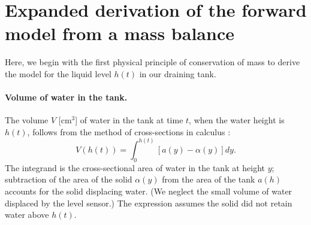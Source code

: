 \documentclass[a4paper,fleqn]{cas-sc}
\begin{document}
\clearpage

\section{Expanded derivation of the forward model from a mass balance}
Here, we begin with the first physical principle of conservation of mass to derive the model for the liquid level $h(t)$ in our draining tank.

\paragraph{Volume of water in the tank.} 
The volume $V$ [cm$^3$] of water in the tank at time $t$, when the water height is $h(t)$, follows from the method of cross-sections in calculus \cite{debook}:
\begin{equation}
	V(h(t))=\int_0^{h(t)} \left[a(y) - \alpha(y) \right] dy. \label{eq:volume}
\end{equation}
The integrand is the cross-sectional area of water in the tank at height $y$; subtraction of the area of the solid $\alpha(y)$ from the area of the tank $a(h)$ accounts for the solid displacing water. (We neglect the small volume of water displaced by the level sensor.) The expression assumes the solid did not retain water above $h(t)$.
 



\clearpage



 
\end{document}
